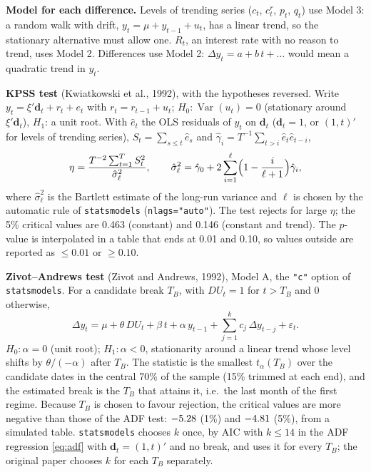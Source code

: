 \documentclass[11pt,a4paper]{article}
\begin{document}
\textbf{Model for each difference.} Levels of trending series ($c_t$, $c^r_t$, $p_t$, $q_t$) use Model 3: a random walk with drift,
$y_t = \mu + y_{t-1} + u_t$, has a linear trend, so the stationary alternative must allow one. $R_t$, an interest rate with no reason
to trend, uses Model 2. Differences use Model 2: $\Delta y_t = a + b\,t + \dots$ would mean a quadratic trend in $y_t$.

\textbf{KPSS test} (Kwiatkowski et al., 1992), with the hypotheses reversed. Write $y_t = \xi'\mathbf{d}_t + r_t + e_t$ with
$r_t = r_{t-1} + u_t$; $H_0\colon \operatorname{Var}(u_t) = 0$ (stationary around $\xi'\mathbf{d}_t$), $H_1$: a unit root. With
$\hat e_t$ the OLS residuals of $y_t$ on $\mathbf{d}_t$ ($\mathbf{d}_t = 1$, or $(1, t)'$ for levels of trending series),
$S_t = \sum_{s \le t} \hat e_s$ and $\hat\gamma_i = T^{-1}\sum_{t > i} \hat e_t \hat e_{t-i}$,
\begin{equation}
\eta = \frac{T^{-2} \sum_{t=1}^{T} S_t^2}{\hat\sigma^2_{\ell}}, \qquad
\hat\sigma^2_{\ell} = \hat\gamma_0 + 2 \sum_{i=1}^{\ell} \Bigl(1 - \frac{i}{\ell + 1}\Bigr) \hat\gamma_i, \label{eq:kpss}
\end{equation}
where $\hat\sigma^2_\ell$ is the Bartlett estimate of the long-run variance and $\ell$ is chosen by the automatic rule of
\texttt{statsmodels} (\texttt{nlags="auto"}). The test rejects for large $\eta$; the 5\% critical values are 0.463 (constant) and
0.146 (constant and trend). The $p$-value is interpolated in a table that ends at 0.01 and 0.10, so values outside are reported as
$\le 0.01$ or $\ge 0.10$.

\textbf{Zivot--Andrews test} (Zivot and Andrews, 1992), Model A, the \texttt{"c"} option of \texttt{statsmodels}. For a candidate
break $T_B$, with $DU_t = 1$ for $t > T_B$ and 0 otherwise,
\begin{equation}
\Delta y_t = \mu + \theta\, DU_t + \beta\, t + \alpha\, y_{t-1} + \sum_{j=1}^{k} c_j\, \Delta y_{t-j} + \varepsilon_t . \label{eq:za}
\end{equation}
$H_0\colon \alpha = 0$ (unit root); $H_1\colon \alpha < 0$, stationarity around a linear trend whose level shifts by $\theta/(-\alpha)$
after $T_B$. The statistic is the smallest $t_{\alpha}(T_B)$ over the candidate dates in the central 70\% of the sample (15\%
trimmed at each end), and the estimated break is the $T_B$ that attains it, i.e.\ the last month of the first regime. Because $T_B$ is chosen to favour
rejection, the critical values are more negative than those of the ADF test: $-5.28$ (1\%) and $-4.81$ (5\%), from a
simulated table. \texttt{statsmodels} chooses $k$ once, by AIC with $k \le 14$ in the ADF regression \eqref{eq:adf} with
$\mathbf{d}_t = (1, t)'$ and no break, and uses it for every $T_B$; the original paper chooses $k$ for each $T_B$ separately.
\end{document}
